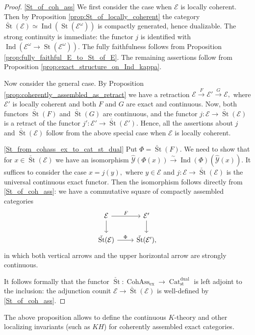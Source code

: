 \documentclass[11pt,leqno]{amsart}
\numberwithin{equation}{section}
\newcommand{\xto}{\xrightarrow}
\newcommand{\Cat}{\operatorname{Cat}}
\newcommand{\ex}{\operatorname{ex}}
\newcommand{\St}{\operatorname{St}}
\newcommand{\st}{\operatorname{st}}
\newcommand{\dual}{\operatorname{dual}}
\newcommand{\cE}{{\mathcal E}}
\newcommand{\cY}{{\mathcal Y}}
\newcommand{\Cohass}{\operatorname{CohAss}}
\newcommand{\Ind}{\operatorname{Ind}}
\begin{document}
\begin{proof}
\ref{St_of_coh_ass} We first consider the case when $\cE$ is locally coherent. Then by Proposition \ref{prop:St_of_locally_coherent} the category $\check{\St}(\cE)\simeq \Ind(\St(\cE^{\omega}))$ is compactly generated, hence dualizable. The strong continuity is immediate: the functor $j$ is identified with $\Ind(\cE^{\omega}\to \St(\cE^{\omega})).$ The fully faithfulness follows from Proposition \ref{prop:fully_faithful_E_to_St_of_E}. The remaining assertions follow from Proposition \ref{prop:exact_structure_on_Ind_kappa}.

Now consider the general case. By Proposition \ref{prop:coherently_assembled_as_retract} we have a retraction $\cE\xto{F}\cE'\xto{G}\cE,$ where $\cE'$ is locally coherent and both $F$ and $G$ are exact and continuous. Now, both functors $\check{\St}(F)$ and $\check{\St}(G)$ are continuous, and the functor $j:\cE\to\check{\St}(\cE)$ is a retract of the functor $j':\cE'\to \check{\St}(\cE').$ Hence, all the assertions about $j$ and $\check{\St}(\cE)$ follow from the above special case when $\cE$ is locally coherent.

\ref{St_from_cohass_ex_to_cat_st_dual} Put $\Phi=\check{\St}(F).$ We need to show that for $x\in\check{\St}(\cE)$ we have an isomorphism $\hat{\cY}(\Phi(x))\xto{\sim}\Ind(\Phi)(\hat{\cY}(x)).$ It suffices to consider the case $x=j(y),$ where $y\in\cE$ and $j:\cE\to \check{\St}(\cE)$ is the universal continuous exact functor. Then the isomorphism follows directly from \ref{St_of_coh_ass}: we have a commutative square of compactly assembled categories
\begin{equation*}
\begin{tikzcd}
\cE\ar[r, "F"]\ar[d] & \cE'\ar[d]\\
\check{\St}(\cE)\ar[r, "\Phi"] & \check{\St}(\cE'),
\end{tikzcd}
\end{equation*}
in which both vertical arrows and the upper horizontal arrow are strongly continuous.

It follows formally that the functor $\check{\St}:\Cohass_{\ex}\to\Cat_{\st}^{\dual}$ is left adjoint to the inclusion: the adjunction counit $\cE\to\check{\St}(\cE)$ is well-defined by \ref{St_of_coh_ass}.
\end{proof}

The above proposition allows to define the continuous $K$-theory and other localizing invariants (such as $KH$) for coherently assembled exact categories.
\end{document}
